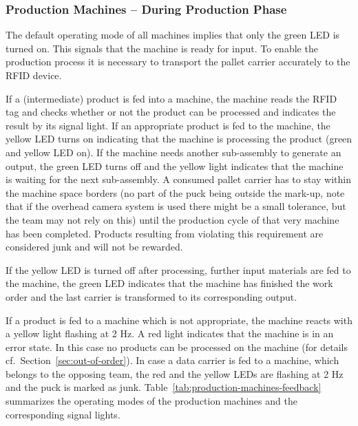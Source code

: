 \documentclass[12pt,twoside]{article}
\newcommand{\refsec}[1]{Section~\ref{#1}}
\begin{document}
\subsubsection{Production Machines -- During Production Phase}
The default operating mode of all machines implies that only the green
LED is turned on. This signals that the machine is ready for input.
To enable the production process it is necessary to transport the
pallet carrier accurately to the RFID device.

If a (intermediate) product is fed into a machine, the machine reads
the RFID tag and checks whether or not the product can be processed
and indicates the result by its signal light. If an appropriate
product is fed to the machine, the yellow LED turns on indicating that
the machine is processing the product (green and yellow LED on). If
the machine needs another sub-assembly to generate an output, the
green LED turns off and the yellow light indicates that the machine is
waiting for the next sub-assembly. A consumed pallet carrier has to
stay within the machine space borders (no part of the puck being
outside the mark-up, note that if the overhead camera system is used
there might be a small tolerance, but the team may not rely on this)
until the production cycle of that very machine has been completed.
Products resulting from violating this requirement are considered junk
and will not be rewarded.

If the yellow LED is turned off after processing, further input
materials are fed to the machine, the green LED indicates that the
machine has finished the work order and the last carrier is
transformed to its corresponding output.

If a product is fed to a machine which is not appropriate, the machine
reacts with a yellow light flashing at 2 Hz. A red light indicates
that the machine is in an error state.  In this case no products can
be processed on the machine (for details
cf.~\refsec{sec:out-of-order}). In case a data carrier is fed to a
machine, which belongs to the opposing team, the red and the yellow
LEDs are flashing at 2 Hz and the puck is marked as junk.
Table~\ref{tab:production-machines-feedback} summarizes the operating
modes of the production machines and the corresponding signal lights.
\end{document}
